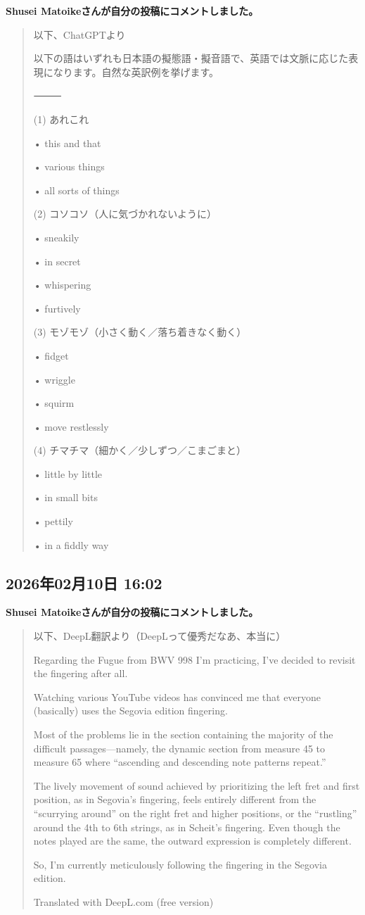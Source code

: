 \textbf{Shusei Matoikeさんが自分の投稿にコメントしました。}

\begin{quote}
以下、ChatGPTより

以下の語はいずれも日本語の擬態語・擬音語で、英語では文脈に応じた表現になります。自然な英訳例を挙げます。

⸻

(1) あれこれ

• this and that

• various things

• all sorts of things

(2) コソコソ（人に気づかれないように）

• sneakily

• in secret

• whispering

• furtively

(3) モゾモゾ（小さく動く／落ち着きなく動く）

• fidget

• wriggle

• squirm

• move restlessly

(4) チマチマ（細かく／少しずつ／こまごまと）

• little by little

• in small bits

• pettily

• in a fiddly way
\end{quote}

\subsection*{2026年02月10日 16:02}

\textbf{Shusei Matoikeさんが自分の投稿にコメントしました。}

\begin{quote}
以下、DeepL翻訳より（DeepLって優秀だなあ、本当に）

Regarding the Fugue from BWV 998 I'm practicing, I've decided to revisit the fingering after all.

Watching various YouTube videos has convinced me that everyone (basically) uses the Segovia edition fingering.

Most of the problems lie in the section containing the majority of the difficult passages—namely, the dynamic section from measure 45 to measure 65 where “ascending and descending note patterns repeat.”

The lively movement of sound achieved by prioritizing the left fret and first position, as in Segovia's fingering, feels entirely different from the “scurrying around” on the right fret and higher positions, or the “rustling” around the 4th to 6th strings, as in Scheit's fingering. Even though the notes played are the same, the outward expression is completely different.

So, I'm currently meticulously following the fingering in the Segovia edition.

Translated with DeepL.com (free version)
\end{quote}

